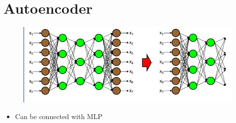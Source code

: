 \documentclass[]{report}
\begin{document}
\section{Autoencoder}
\begin{figure}[H]
\centerline{\includegraphics[width=1.2\linewidth]{autoencoder}}
\end{figure}
\begin{itemize}
\item Can be connected with MLP
\end{itemize}
\end{document}
